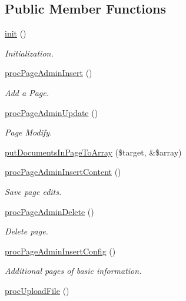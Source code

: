 \subsection*{Public Member Functions}
\begin{DoxyCompactItemize}
\item 
\hyperlink{classpageAdminController_a404c9597cbe5970e977b4d756ec3a38a}{init} ()
\begin{DoxyCompactList}\small\item\em Initialization. \end{DoxyCompactList}\item 
\hyperlink{classpageAdminController_ad93c99256e3e6c6d954205e315af9676}{proc\-Page\-Admin\-Insert} ()
\begin{DoxyCompactList}\small\item\em Add a Page. \end{DoxyCompactList}\item 
\hyperlink{classpageAdminController_a93c190dce6ce7759a509affc3f4b8167}{proc\-Page\-Admin\-Update} ()
\begin{DoxyCompactList}\small\item\em Page Modify. \end{DoxyCompactList}\item 
\hyperlink{classpageAdminController_af0ce030cf373648852d09bb95cd318fa}{put\-Documents\-In\-Page\-To\-Array} (\$target, \&\$array)
\item 
\hyperlink{classpageAdminController_a95d451eb68ffc5dd783a464d955724ac}{proc\-Page\-Admin\-Insert\-Content} ()
\begin{DoxyCompactList}\small\item\em Save page edits. \end{DoxyCompactList}\item 
\hyperlink{classpageAdminController_a11d50b1c3ffb7872eba5519cff6e9e28}{proc\-Page\-Admin\-Delete} ()
\begin{DoxyCompactList}\small\item\em Delete page. \end{DoxyCompactList}\item 
\hyperlink{classpageAdminController_a3f1f8463705b9d0daf358097e57feb2d}{proc\-Page\-Admin\-Insert\-Config} ()
\begin{DoxyCompactList}\small\item\em Additional pages of basic information. \end{DoxyCompactList}\item 
\hyperlink{classpageAdminController_a0bec7de800ea8fc74b75e71d829bffb2}{proc\-Upload\-File} ()

\end{DoxyCompactItemize}
